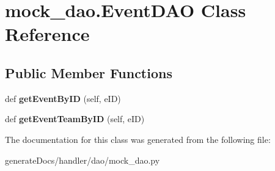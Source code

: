 \hypertarget{classmock__dao_1_1_event_d_a_o}{}\section{mock\+\_\+dao.\+Event\+D\+AO Class Reference}
\label{classmock__dao_1_1_event_d_a_o}
\subsection*{Public Member Functions}
\begin{DoxyCompactItemize}
\item 
\mbox{\label{classmock__dao_1_1_event_d_a_o_aff119303bcb67478e1b531eaf8402c47}} 
def {\bfseries get\+Event\+By\+ID} (self, e\+ID)
\item 
\mbox{\label{classmock__dao_1_1_event_d_a_o_a66744da0b89f27a6279c85c4d1017a30}} 
def {\bfseries get\+Event\+Team\+By\+ID} (self, e\+ID)
\end{DoxyCompactItemize}


The documentation for this class was generated from the following file\+:\begin{DoxyCompactItemize}
\item 
generate\+Docs/handler/dao/mock\+\_\+dao.\+py\end{DoxyCompactItemize}
